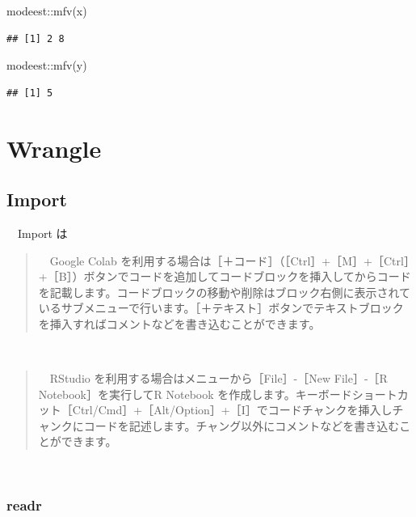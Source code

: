 \documentclass[
  12pt,
]{book}
\newenvironment{Shaded}{\begin{snugshade}}{\end{snugshade}}
\newcommand{\FunctionTok}[1]{\textcolor[rgb]{0.00,0.00,0.00}{#1}}
\newcommand{\NormalTok}[1]{#1}
\newcommand{\SpecialCharTok}[1]{\textcolor[rgb]{0.00,0.00,0.00}{#1}}
\begin{document}
\begin{Shaded}
\begin{Highlighting}[]
\NormalTok{modeest}\SpecialCharTok{::}\FunctionTok{mfv}\NormalTok{(x)}
\end{Highlighting}
\end{Shaded}

\begin{verbatim}
## [1] 2 8
\end{verbatim}

\begin{Shaded}
\begin{Highlighting}[]
\NormalTok{modeest}\SpecialCharTok{::}\FunctionTok{mfv}\NormalTok{(y)}
\end{Highlighting}
\end{Shaded}

\begin{verbatim}
## [1] 5
\end{verbatim}

\hypertarget{part-wrangle}{%
\part{Wrangle}\label{part-wrangle}}

\hypertarget{import-2}{%
\chapter{Import}\label{import-2}}

　Import は

\begin{quote}
　Google Colab を利用する場合は［＋コード］（［Ctrl］+［M］+［Ctrl］+［B］）ボタンでコードを追加してコードブロックを挿入してからコードを記載します。コードブロックの移動や削除はブロック右側に表示されているサブメニューで行います。［＋テキスト］ボタンでテキストブロックを挿入すればコメントなどを書き込むことができます。
\end{quote}

　

\begin{quote}
　RStudio を利用する場合はメニューから［File］-［New File］-［R Notebook］を実行してR Notebook を作成します。キーボードショートカット［Ctrl/Cmd］+［Alt/Option］+［I］でコードチャンクを挿入しチャンクにコードを記述します。チャング以外にコメントなどを書き込むことができます。
\end{quote}

　

\hypertarget{readr}{%
\section{readr}\label{readr}}
\end{document}
